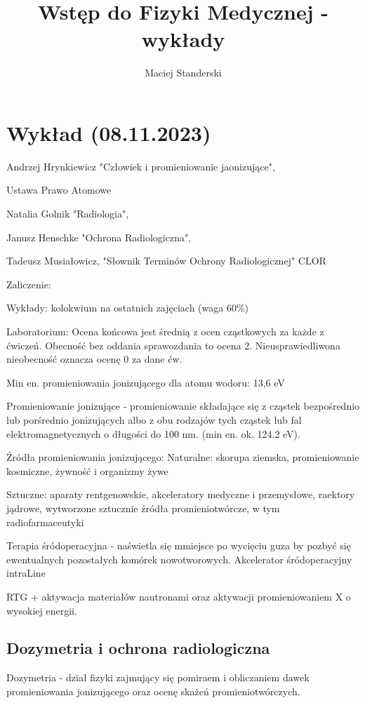 \documentclass{article}
\title{Wstęp do Fizyki Medycznej - wykłady}
\author{Maciej Standerski}
\begin{document}
\maketitle

\section{Wykład (08.11.2023)}

Andrzej Hrynkiewicz "Człowiek i promieniowanie jaonizujące",

Ustawa Prawo Atomowe

Natalia Golnik "Radiologia",

Janusz Henschke "Ochrona Radiologiczna",

Tadeusz Musiałowicz, "Słownik Terminów Ochrony Radiologicznej" CLOR

Zaliczenie:

Wykłady: kolokwium na ostatnich zajęciach (waga 60\%)

Laboratorium: Ocena końcowa jest średnią z ocen cząstkowych za każde z ćwiczeń. Obecność bez oddania sprawozdania to ocena 2. Nieusprawiedliwona nieobecność oznacza ocenę 0 za dane ćw.

Min en. promieniowania jonizującego dla atomu wodoru: 13,6 eV

Promieniowanie jonizujące - promieniowanie składające się z cząstek bezpośrednio lub porśrednio jonizujących albo z obu rodzajów tych cząstek lub fal elektromagnetycznych o długości do 100 nm. (min en. ok. 124.2 eV).

Źródła promieniowania jonizującego:
Naturalne: skorupa ziemska, promieniowanie kosmiczne, żywność i organizmy żywe

Sztuczne: aparaty rentgenowskie, akceleratory medyczne i przemysłowe, raektory jądrowe, wytworzone sztucznie źródła promieniotwórcze, w tym radiofarmaceutyki

Terapia śródoperacyjna - naświetla się mmiejsce po wycięciu guza by pozbyć się ewentualnych pozostałych komórek nowotworowych. Akcelerator śródoperacyjny intraLine

RTG + aktywacja materiałów nautronami oraz aktywacji promieniowaniem X o wysokiej energii.

\subsection{Dozymetria i ochrona radiologiczna}

Dozymetria - dział fizyki zajmujący się pomiraem i obliczaniem dawek promieniowania jonizującego oraz ocenę skażeń promieniotwórczych.
\end{document}
